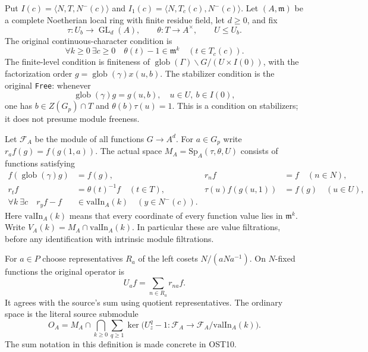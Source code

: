 Put $I(c)=\langle N,T,N^-(c)\rangle$ and
$I_1(c)=\langle N,T_c(c),N^-(c)\rangle$.  Let $(A,\mathfrak m)$
be a complete Noetherian local ring with finite residue field, let
$d\geq0$, and fix
\[
 \tau:U_b\longrightarrow\operatorname{GL}_d(A),\qquad
 \theta:T\longrightarrow A^\times,\qquad U\leq U_b.
\]
The original continuous-character condition is
\begin{equation}\label{eq:ost-contchar}
 \forall k\geq0\ \exists c\geq0\quad
             \theta(t)-1\in\mathfrak m^k\quad(t\in T_c(c)).
\end{equation}
The finite-level condition is finiteness of
$\operatorname{glob}(\Gamma)\backslash G/(U\times I(0))$,
with the factorization order
$g=\operatorname{glob}(\gamma)x(u,b)$.  The stabilizer condition
is the original \texttt{Free}: whenever
\begin{equation}\label{eq:ost-stabilizer}
 \operatorname{glob}(\gamma)g=g(u,b),\quad u\in U,\ b\in I(0),
\end{equation}
one has $b\in Z(G_p)\cap T$ and $\theta(b)\tau(u)=1$.
This is a condition on stabilizers; it does not presume module freeness.

Let $\mathcal F_A$ be the module of all functions $G\to A^d$.
For $a\in G_p$ write $r_a f(g)=f(g(1,a))$.  The actual space
$M_A=\mathrm{Sp}_A(\tau,\theta,U)$ consists of functions satisfying
\begin{align}
 f(\operatorname{glob}(\gamma)g)&=f(g), &
 r_n f&=f\quad(n\in N),\\
 r_t f&=\theta(t)^{-1}f\quad(t\in T), &
 \tau(u)f(g(u,1))&=f(g)\quad(u\in U),\\
 \forall k\ \exists c\quad
 r_y f-f&\in\mathrm{valIn}_A(k)\quad(y\in N^-(c)).
 \label{eq:ost-space}
\end{align}
Here $\mathrm{valIn}_A(k)$ means that every coordinate of every
function value lies in $\mathfrak m^k$.  Write
$V_A(k)=M_A\cap\mathrm{valIn}_A(k)$.  In particular these
are value filtrations, before any identification with intrinsic
module filtrations.

For $a\in P$ choose representatives $R_a$ of the left cosets
$N/(aNa^{-1})$.  On $N$-fixed functions the original operator is
\begin{equation}\label{eq:ost-ua}
                 U_a f=\sum_{n\in R_a}r_{na}f.
\end{equation}
It agrees with the source's sum using quotient representatives.
The ordinary space is the literal source submodule
\begin{equation}\label{eq:ost-ord-definition}
 O_A=M_A\cap\bigcap_{k\geq0}
       \sum_{q\geq1}\ker\bigl(U_z^q-1:
                         \mathcal F_A\to\mathcal F_A/
                                      \mathrm{valIn}_A(k)\bigr).
\end{equation}
The sum notation in this definition is made concrete in OST10.

